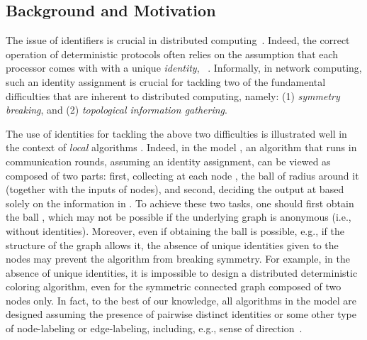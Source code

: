 \documentclass{llncs}
\begin{document}
\subsection{Background and Motivation}

The issue of identifiers is crucial in distributed computing~\cite{A80,NS93}. Indeed, the  correct operation of deterministic protocols often relies on the assumption that each processor  comes with with a unique \emph{identity}, ~\cite{GHS}. Informally, in network computing, such an identity assignment is crucial for tackling two of the fundamental difficulties that are inherent to  distributed computing, namely: (1) {\em symmetry breaking}, and  (2)  {\em topological information gathering}. 

The use of identities for tackling the above two difficulties is illustrated well in the context of \emph{local} algorithms \cite{L92,L86}. Indeed, in the  model \cite{PelB00}, an algorithm that runs in  communication rounds, assuming an identity assignment, can be viewed as composed of two parts: first, collecting at each node , the ball  of radius  around it (together with the inputs of nodes), and second, deciding the output at    based solely on the information in . To achieve these two tasks, one should first obtain the ball , which may not be possible if the underlying graph is anonymous (i.e., without identities). Moreover, even if obtaining the ball is possible, e.g., if the structure of the graph allows it, the absence of unique identities  given to the nodes may prevent the algorithm from breaking symmetry. For example, in the absence of unique identities, it is impossible to design a distributed deterministic coloring algorithm, even for the symmetric connected graph composed of two nodes only.  In fact, to the best of our knowledge, all algorithms in the  model are designed assuming the presence of pairwise distinct identities or some other type of node-labeling or edge-labeling, including, e.g., sense of direction~\cite{BM09,HKP01,K09,LPR09,NS93,PS96}. 
\end{document}
